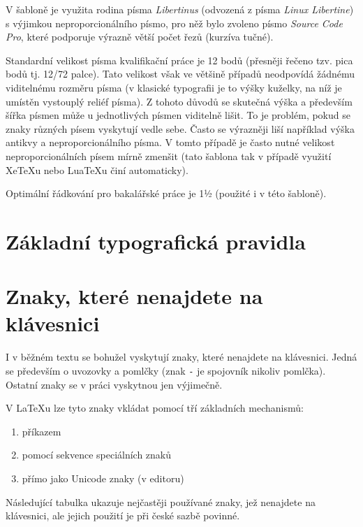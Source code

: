 \documentclass[male,czech,api_bc]{kitheses}
\begin{document}
V šabloně je využita rodina písma \textit{Libertinus} (odvozená z písma \textit{Linux Libertine}) s výjimkou neproporcionálního písmo, pro něž bylo zvoleno písmo \textit{Source Code Pro}, které podporuje výrazně větší počet řezů (kurzíva tučné).

Standardní velikost písma kvalifikační práce je 12 bodů (přesněji řečeno tzv. pica bodů tj. 12/72 palce). Tato velikost však ve většině případů neodpovídá žádnému viditelnému rozměru písma (v klasické typografii je to výšky kuželky, na níž je umístěn vystouplý reliéf písma). Z  tohoto důvodů se skutečná výška a především šířka písmen může u jednotlivých písmen viditelně lišit. To je problém, pokud se znaky různých písem vyskytují vedle sebe. Často se výrazněji liší například výška antikvy a  neproporcionálního písma. V tomto případě je často nutné velikost neproporcionálních písem mírně zmenšit (tato šablona tak v případě využití XeTeXu nebo LuaTeXu činí automaticky).

Optimální řádkování pro bakalářské práce je 1½ (použité i v této šabloně).

\section{Základní typografická pravidla}

\section{Znaky, které nenajdete na klávesnici}

I v běžném textu se bohužel vyskytují znaky, které nenajdete na klávesnici.
Jedná se především o uvozovky a pomlčky (znak \texttt{-} je spojovník nikoliv pomlčka). Ostatní znaky se v práci vyskytnou jen výjimečně.

V \LaTeX{}u lze tyto znaky vkládat pomocí tří základních mechanismů:
\begin{enumerate}
\item příkazem
\item pomocí sekvence speciálních znaků
\item přímo jako Unicode znaky (v editoru)
\end{enumerate}

Následující tabulka ukazuje nejčastěji používané znaky, jež nenajdete na klávesnici, ale jejich použití je při české sazbě povinné.
\end{document}
